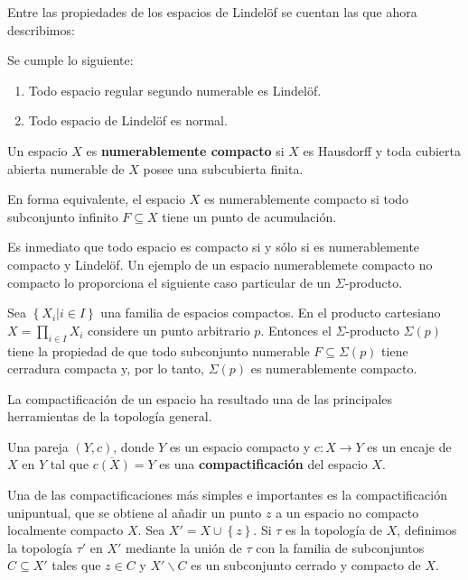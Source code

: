 \documentclass[12pt]{report}
\theoremstyle{largebreak}
\newcommand{\cf}[3]{\ensuremath{#1:#2\rightarrow#3}}
\begin{document}
    Entre las propiedades de los espacios de Lindelöf se cuentan las que ahora describimos:

    \begin{propo}
        Se cumple lo siguiente:
        \begin{enumerate}
            \item Todo espacio regular segundo numerable es Lindelöf.
            \item Todo espacio de Lindelöf es normal.
        \end{enumerate}
    \end{propo}

    \begin{mydef}
        Un espacio $X$ es \textbf{numerablemente compacto} si $X$ es Hausdorff y toda cubierta abierta numerable de $X$ posee una subcubierta finita.
    \end{mydef}

    En forma equivalente, el espacio $X$ es numerablemente compacto si todo subconjunto infinito $F\subseteq X$ tiene un punto de acumulación.

    Es inmediato que todo espacio es compacto si y sólo si es numerablemente compacto y Lindelöf. Un ejemplo de un espacio numerablemete compacto no compacto lo proporciona el siguiente caso particular de un $\Sigma$-producto.

    \begin{theor}
        Sea $\left\{X_i\big| i\in I \right\}$ una familia de espacios compactos. En el producto cartesiano $X=\prod_{i\in I }X_i$ considere un punto arbitrario $p$. Entonces el $\Sigma$-producto $\Sigma(p)$ tiene la propiedad de que todo subconjunto numerable $F\subseteq\Sigma(p)$ tiene cerradura compacta y, por lo tanto, $\Sigma(p)$ es numerablemente compacto.
    \end{theor}

    La compactificación de un espacio ha resultado una de las principales herramientas de la topología general.

    \begin{mydef}
        Una pareja $(Y,c)$, donde $Y$ es un espacio compacto y $\cf{c}{X}{Y}$ es un encaje de $X$ en $Y$ tal que $\overline{c(X)}=Y$ es una \textbf{compactificación} del espacio $X$.
    \end{mydef}

    \begin{exa}
        Una de las compactificaciones más simples e importantes es la compactificación unipuntual, que se obtiene al añadir un punto $z$ a un espacio no compacto localmente compacto $X$. Sea $X'=X\cup\left\{z \right\}$. Si $\tau$ es la topología de $X$, definimos la topología $\tau'$ en $X'$ mediante la unión de $\tau$ con la familia de subconjuntos $C\subseteq X'$ tales que $z\in C$ y $X'\backslash C$ es un subconjunto cerrado y compacto de $X$.
    \end{exa}
\end{document}
